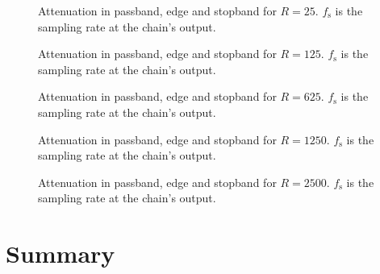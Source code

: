 \begin{figure}
    \centering
    
    \caption[Attenuation in Passband, Edge and Stopband for $R=25$]{%
        Attenuation in passband, edge and stopband for $R=25$.
        $f_\mathrm{s}$ is the sampling rate at the chain's output.%
    }
    \label{fig:verification:fB25}
\end{figure}

\begin{figure}
    \centering
    
    \caption[Attenuation in Passband, Edge and Stopband for $R=125$]{%
        Attenuation in passband, edge and stopband for $R=125$.
        $f_\mathrm{s}$ is the sampling rate at the chain's output.%
    }
    \label{fig:verification:fB125}
\end{figure}

\begin{figure}
    \centering
    
    \caption[Attenuation in Passband, Edge and Stopband for $R=625$]{%
        Attenuation in passband, edge and stopband for $R=625$.
        $f_\mathrm{s}$ is the sampling rate at the chain's output.%
    }
    \label{fig:verification:fB625}
\end{figure}

\begin{figure}
    \centering
    
    \caption[Attenuation in Passband, Edge and Stopband for $R=1250$]{%
        Attenuation in passband, edge and stopband for $R=1250$.
        $f_\mathrm{s}$ is the sampling rate at the chain's output.%
    }
    \label{fig:verification:fB1250}
\end{figure}

\begin{figure}
    \centering
    
    \caption[Attenuation in Passband, Edge and Stopband for $R=2500$]{%
        Attenuation   in   passband,   edge   and   stopband   for   $R=2500$.
        $f_\mathrm{s}$ is the sampling rate at the chain's output.%
    }
    \label{fig:verification:fB2500}
\end{figure}

%
%
\clearpage
\section{Summary} %
\label{sec:verification:summary}

